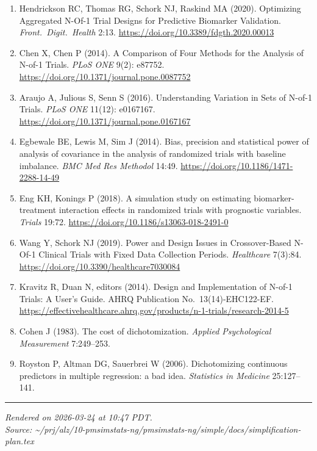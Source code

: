 \documentclass[11pt,letterpaper]{article}
\begin{document}
\begin{enumerate}[nosep]
\item Hendrickson RC, Thomas RG, Schork NJ, Raskind MA (2020).
  Optimizing Aggregated N-Of-1 Trial Designs for Predictive Biomarker
  Validation. \textit{Front.\ Digit.\ Health} 2:13.
  \url{https://doi.org/10.3389/fdgth.2020.00013}

\item Chen X, Chen P (2014). A Comparison of Four Methods for the
  Analysis of N-of-1 Trials. \textit{PLoS ONE} 9(2): e87752.
  \url{https://doi.org/10.1371/journal.pone.0087752}

\item Araujo A, Julious S, Senn S (2016). Understanding Variation in
  Sets of N-of-1 Trials. \textit{PLoS ONE} 11(12): e0167167.
  \url{https://doi.org/10.1371/journal.pone.0167167}

\item Egbewale BE, Lewis M, Sim J (2014). Bias, precision and
  statistical power of analysis of covariance in the analysis of
  randomized trials with baseline imbalance. \textit{BMC Med Res
  Methodol} 14:49. \url{https://doi.org/10.1186/1471-2288-14-49}

\item Eng KH, Konings P (2018). A simulation study on estimating
  biomarker-treatment interaction effects in randomized trials with
  prognostic variables. \textit{Trials} 19:72.
  \url{https://doi.org/10.1186/s13063-018-2491-0}

\item Wang Y, Schork NJ (2019). Power and Design Issues in
  Crossover-Based N-Of-1 Clinical Trials with Fixed Data Collection
  Periods. \textit{Healthcare} 7(3):84.
  \url{https://doi.org/10.3390/healthcare7030084}

\item Kravitz R, Duan N, editors (2014). Design and Implementation of
  N-of-1 Trials: A User's Guide. AHRQ Publication No.\
  13(14)-EHC122-EF.
  \url{https://effectivehealthcare.ahrq.gov/products/n-1-trials/research-2014-5}

\item Cohen J (1983). The cost of dichotomization. \textit{Applied
  Psychological Measurement} 7:249--253.

\item Royston P, Altman DG, Sauerbrei W (2006). Dichotomizing
  continuous predictors in multiple regression: a bad idea.
  \textit{Statistics in Medicine} 25:127--141.
\end{enumerate}

\vfill
\noindent\rule{\textwidth}{0.4pt}

{\small\itshape Rendered on 2026-03-24 at 10:47 PDT.\\
Source: \textasciitilde/prj/alz/10-pmsimstats-ng/pmsimstats-ng/simple/docs/simplification-plan.tex}
\end{document}
